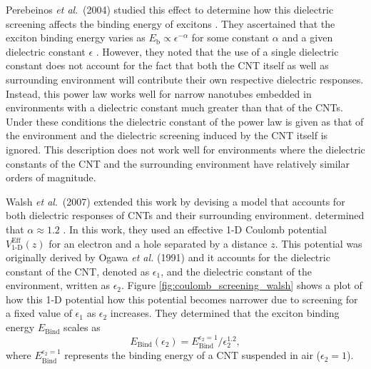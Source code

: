 Perebeinos \textit{et al}.\ (2004) studied this effect to determine how this dielectric screening affects the binding energy of excitons \cite{perebeinos2004scaling}. They ascertained that the exciton binding energy varies as $E_\text{b} \propto \epsilon^{-\alpha}$ for some constant $\alpha$ and a given dielectric constant $\epsilon$ \cite{perebeinos2004scaling}. However, they noted that the use of a single dielectric constant does not account for the fact that both the CNT itself as well as surrounding environment will contribute their own respective dielectric responses. Instead, this power law works well for narrow nanotubes embedded in environments with a dielectric constant much greater than that of the CNTs. Under these conditions the dielectric constant of the power law is given as that of the environment and the dielectric screening induced by the CNT itself is ignored. This description does not work well for environments where the dielectric constants of the CNT and the surrounding environment have relatively similar orders of magnitude.

Walsh \textit{et al}.\ (2007) extended this work by devising a model that accounts for both dielectric responses of CNTs and their surrounding environment. determined that $\alpha \approx 1.2$ \cite{walsh2008scaling}. In this work, they used an effective 1-D Coulomb potential $V_\text{1-D}^\text{Eff}(z)$ for an electron and a hole separated by a distance $z$. This potential was originally derived by Ogawa \textit{et al.} (1991) \cite{ogawa1991optical} and it accounts for the dielectric constant of the CNT, denoted as $\epsilon_1$, and the dielectric constant of the environment, written as $\epsilon_2$. Figure \ref{fig:coulomb_screening_walsh} shows a plot of how this 1-D potential how this potential becomes narrower due to screening for a fixed value of $\epsilon_1$ as $\epsilon_2$ increases. They determined that the exciton binding energy $E_\text{Bind}$ scales as
\begin{equation}
	E_\text{Bind} (\epsilon_2) = E_\text{Bind}^{\epsilon_2 = 1} / \epsilon_2^{1.2},
\end{equation}
where $ E_\text{Bind}^{\epsilon_2 = 1}$ represents the binding energy of a CNT suspended in air ($\epsilon_2 = 1$).

